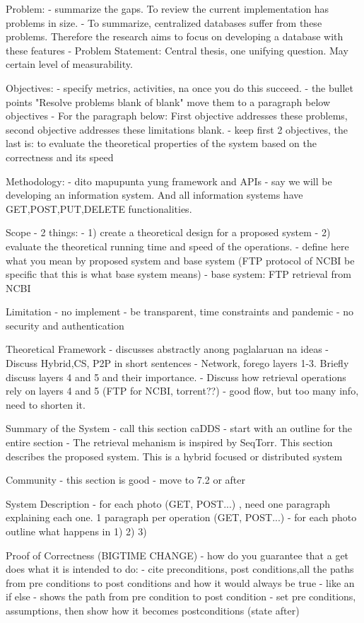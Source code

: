 Problem:
- summarize the gaps. To review the current implementation has problems in size.
- To summarize, centralized databases suffer from these problems. Therefore the research aims to focus on developing a database with these features
- Problem Statement: Central thesis, one unifying question. May certain level of measurability.

Objectives:
- specify metrics, activities, na once you do this succeed.
- the bullet points "Resolve problems blank of blank" move them to a paragraph below objectives
- For the paragraph below: First objective addresses these problems, second objective addresses these limitations blank.
- keep first 2 objectives, the last is: to evaluate the theoretical properties of the system based on the correctness and its speed


Methodology:
- dito mapupunta yung framework and APIs
- say we will be developing an information system. And all information systems have GET,POST,PUT,DELETE functionalities.

Scope
- 2 things: 
- 1) create a theoretical design for a proposed system
- 2) evaluate the theoretical running time and speed of the operations.
- define here what you mean by proposed system and base system (FTP protocol of NCBI be specific that this is what base system means)
- base system: FTP retrieval from NCBI

Limitation
- no implement
- be transparent, time constraints and pandemic
- no security and authentication


Theoretical Framework
- discusses abstractly anong paglalaruan na ideas
- Discuss Hybrid,CS, P2P in short sentences
- Network, forego layers 1-3. Briefly discuss layers 4 and 5 and their importance.
- Discuss how retrieval operations rely on layers 4 and 5 (FTP for NCBI, torrent??)
- good flow, but too many info, need to shorten it.

Summary of the System
- call this section caDDS
- start with an outline for the entire section
- The retrieval mehanism is inspired by SeqTorr. This section describes the proposed system. This is a hybrid focused or distributed system

Community
- this section is good
- move to 7.2 or after

System Description
- for each photo (GET, POST...) , need one paragraph explaining each one. 1 paragraph per operation (GET, POST...)
- for each photo outline what happens in 1) 2) 3)


Proof of Correctness (BIGTIME CHANGE)
- how do you guarantee that a get does what it is intended to do:
- cite preconditions, post conditions,all the paths from pre conditions to post conditions and how it would always be true
- like an if else
- shows the path from pre condition to post condition
- set pre conditions, assumptions, then show how it becomes postconditions (state after)


